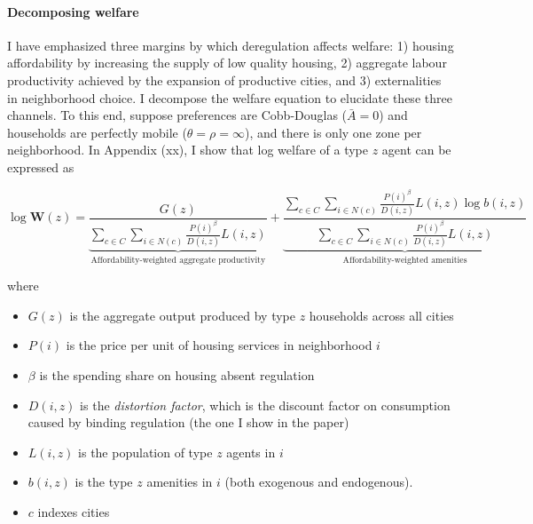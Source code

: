\documentclass[11pt]{article}
\title{}
\author{}
\date{October 26, 2023}
\begin{document}
\maketitle

\paragraph*{Decomposing welfare} I have emphasized three margins by which deregulation affects welfare: 1) housing affordability by increasing the supply of low quality housing, 2) aggregate labour productivity achieved by the expansion of productive cities, and 3) externalities in neighborhood choice. I decompose the welfare equation to elucidate these three channels. To this end, suppose preferences are Cobb-Douglas ($\bar{A} = 0$) and households are perfectly mobile ($\theta = \rho = \infty$), and there is only one zone per neighborhood. In Appendix (xx), I show that log welfare of a type $z$ agent can be expressed as 

\begin{equation}
	\log \boldsymbol{W}(z) =  \underbrace{ \frac{G(z)}{\sum_{c \in C}\sum_{i \in N(c)}\frac{P(i)^{\beta}}{D(i, z)}L(i, z)} }_{\text{Affordability-weighted aggregate productivity}} + \underbrace{ \frac{\sum_{c \in C}\sum_{i \in N(c)}\frac{P(i)^{\beta}}{D(i, z)}L(i, z) \log b(i, z)}{\sum_{c \in C}\sum_{i \in N(c)}\frac{P(i)^{\beta}}{D(i, z)}L(i, z)} }_{\text{Affordability-weighted amenities}}
\end{equation}

where 
\begin{itemize}
	\item  $G(z)$ is the aggregate output produced by type $z$ households across all cities
	
	\item  $P(i)$ is the price per unit of housing services in neighborhood $i$
	
	\item $\beta$ is the spending share on housing absent regulation 
	
	\item $D(i, z)$ is the \textit{distortion factor}, which is the discount factor on consumption caused by binding regulation (the one I show in the paper)
	
	\item $L(i, z)$ is the population of type $z$ agents in $i$
	
	\item $b(i, z)$ is the type $z$ amenities in $i$ (both exogenous and endogenous).
	
	\item $c$ indexes cities
\end{itemize}
\end{document}
